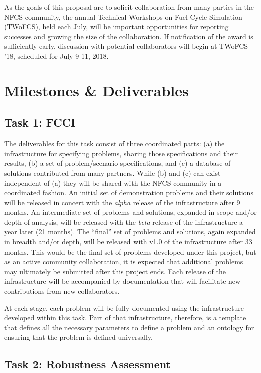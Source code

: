 As the goals of this proposal are to solicit collaboration from many parties
in the \gls{NFCS} community, the annual Technical Workshops on Fuel Cycle
Simulation (TWoFCS), held each July, will be important opportunities for
reporting successes and growing the size of the collaboration.  If
notification of the award is sufficiently early, discussion with potential
collaborators will begin at TWoFCS '18, scheduled for July 9-11, 2018.

\section{Milestones \& Deliverables}

\subsection{Task 1: \gls{FCCI}}

The deliverables for this task consist of three coordinated parts: (a) the
infrastructure for specifying problems, sharing those specifications and their
results, (b) a set of problem/scenario specifications, and (c) a database of
solutions contributed from many partners.  While (b) and (c) can exist
independent of (a) they will be shared with the \gls{NFCS} community in a
coordinated fashion.  An initial set of demonstration problems and their
solutions will be released in concert with the \emph{alpha} release of the
infrastructure after 9 months.  An intermediate set of problems and solutions,
expanded in scope and/or depth of analysis, will be released with the
\emph{beta} release of the infrastructure a year later (21 months).  The
``final'' set of problems and solutions, again expanded in breadth and/or
depth, will be released with v1.0 of the infrastructure after 33 months.  This
would be the final set of problems developed under this project, but as an
active community collaboration, it is expected that additional problems may
ultimately be submitted after this project ends. Each release of the
infrastructure will be accompanied by documentation that will facilitate new
contributions from new collaborators.

At each stage, each problem will be fully documented using the infrastructure
developed within this task.  Part of that infrastructure, therefore, is a
template that defines all the necessary parameters to define a problem and an
ontology for ensuring that the problem is defined universally.

\subsection{Task 2: Robustness Assessment}

